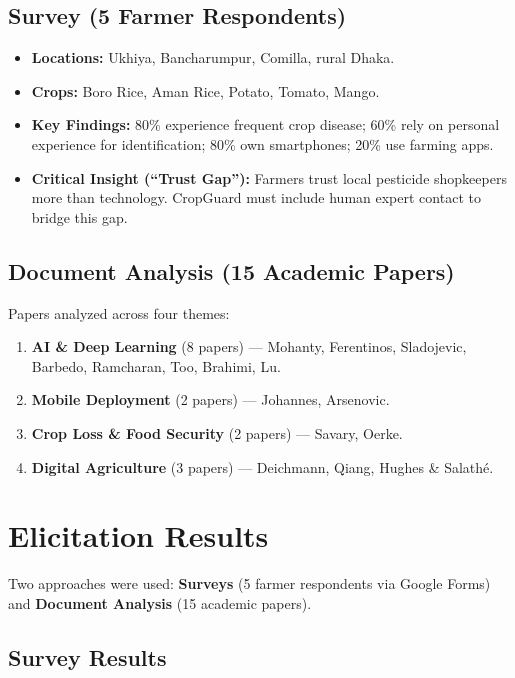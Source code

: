 \documentclass[12pt,a4paper]{article}
\begin{document}
\subsection{Survey (5 Farmer Respondents)}

\begin{itemize}[nosep]
    \item \textbf{Locations:} Ukhiya, Bancharumpur, Comilla, rural Dhaka.
    \item \textbf{Crops:} Boro Rice, Aman Rice, Potato, Tomato, Mango.
    \item \textbf{Key Findings:} 80\% experience frequent crop disease; 60\% rely on personal experience for identification; 80\% own smartphones; 20\% use farming apps.
    \item \textbf{Critical Insight (``Trust Gap''):} Farmers trust local pesticide shopkeepers more than technology. CropGuard must include human expert contact to bridge this gap.
\end{itemize}

\subsection{Document Analysis (15 Academic Papers)}

Papers analyzed across four themes:
\begin{enumerate}[nosep]
    \item \textbf{AI \& Deep Learning} (8 papers) --- Mohanty, Ferentinos, Sladojevic, Barbedo, Ramcharan, Too, Brahimi, Lu.
    \item \textbf{Mobile Deployment} (2 papers) --- Johannes, Arsenovic.
    \item \textbf{Crop Loss \& Food Security} (2 papers) --- Savary, Oerke.
    \item \textbf{Digital Agriculture} (3 papers) --- Deichmann, Qiang, Hughes \& Salath\'{e}.
\end{enumerate}



\section{Elicitation Results}

Two approaches were used: \textbf{Surveys} (5 farmer respondents via Google Forms) and \textbf{Document Analysis} (15 academic papers).

\subsection{Survey Results}
\end{document}
